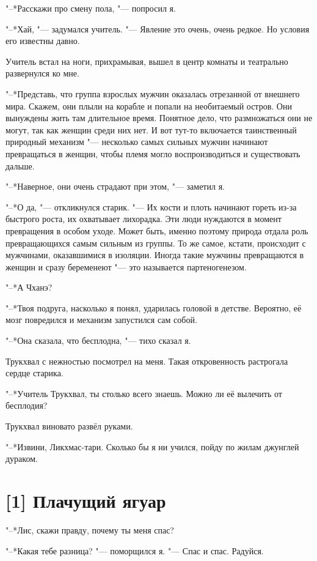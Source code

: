 "--*Расскажи про смену пола, "--- попросил я.

"--*Хай, "--- задумался учитель. "--- Явление это очень, очень редкое.
Но условия его известны давно.

Учитель встал на ноги, прихрамывая, вышел в центр комнаты и театрально развернулся ко мне.

"--*Представь, что группа взрослых мужчин оказалась отрезанной от внешнего мира.
Скажем, они плыли на корабле и попали на необитаемый остров.
Они вынуждены жить там длительное время.
Понятное дело, что размножаться они не могут, так как женщин среди них нет.
И вот тут-то включается таинственный природный механизм "--- несколько самых сильных мужчин начинают превращаться в женщин, чтобы племя могло воспроизводиться и существовать дальше.

"--*Наверное, они очень страдают при этом, "--- заметил я.

"--*О да, "--- откликнулся старик.
"--- Их кости и плоть начинают гореть из-за быстрого роста, их охватывает лихорадка.
Эти люди нуждаются в момент превращения в особом уходе.
Может быть, именно поэтому природа отдала роль превращающихся самым сильным из группы.
То же самое, кстати, происходит с мужчинами, оказавшимися в изоляции.
Иногда такие мужчины превращаются в женщин и сразу беременеют "--- это называется партеногенезом.

"--*А Чханэ?

"--*Твоя подруга, насколько я понял, ударилась головой в детстве.
Вероятно, её мозг повредился и механизм запустился сам собой.

"--*Она сказала, что бесплодна, "--- тихо сказал я.

Трукхвал с нежностью посмотрел на меня.
Такая откровенность растрогала сердце старика.

"--*Учитель Трукхвал, ты столько всего знаешь.
Можно ли её вылечить от бесплодия?

Трукхвал виновато развёл руками.

"--*Извини, Ликхмас-тари.
Сколько бы я ни учился, пойду по жилам джунглей дураком.

\section{[1] Плачущий ягуар}

"--*Лис, скажи правду, почему ты меня спас?

"--*Какая тебе разница? "--- поморщился я.
"--- Спас и спас.
Радуйся.

